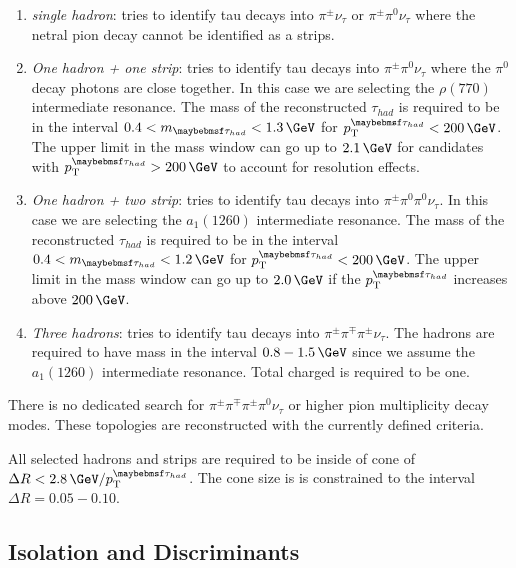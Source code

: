\begin{enumerate}
  \item \textit{single hadron}: tries to identify tau decays into $\pi^{\pm} \nu_\tau$ or $\pi^{\pm} \pi^{0} \nu_\tau$ where the netral pion decay cannot be identified as a strips.
  \item \textit{One hadron + one strip}: tries to identify tau decays into $\pi^{\pm} \pi^{0} \nu_\tau$ where the $\pi^{0}$ decay photons are close together. In this case we are selecting the $\rho(770)$ intermediate resonance. The mass of the reconstructed $\tau_{had}$ is required to be in the interval $0.4<m_{\tau_{had}}<1.3\,\GeV$ for $\pt^{\tau_{had}} < 200\,\GeV$. The upper limit in the mass window can go up to $2.1\,\GeV$ for candidates with $\pt^{\tau_{had}} > 200\,\GeV$ to account for resolution effects.
  \item \textit{One hadron + two strip}: tries to identify tau decays into $\pi^{\pm} \pi^{0} \pi^{0} \nu_\tau$. In this case we are selecting the $a_1(1260)$ intermediate resonance. The mass of the reconstructed $\tau_{had}$ is required to be in the interval $0.4<m_{\tau_{had}}<1.2\,\GeV$ for $\pt^{\tau_{had}} < 200\,\GeV$. The upper limit in the mass window can go up to $2.0\,\GeV$ if the $\pt^{\tau_{had}}$ increases above $200\,\GeV$.
  \item \textit{Three hadrons}: tries to identify tau decays into $\pi^{\pm} \pi^{\mp} \pi^{\pm} \nu_\tau$. The hadrons are required to have mass in the interval $0.8-1.5\,\GeV$ since we assume the $a_{1}(1260)$ intermediate resonance. Total charged is required to be one.
\end{enumerate}

There is no dedicated search for $\pi^{\pm} \pi^{\mp} \pi^{\pm} \pi^{0} \nu_\tau$ or higher pion multiplicity decay modes. These topologies are reconstructed with the currently defined criteria.

All selected hadrons and strips are required to be inside of cone of $\Delta R < 2.8\,\GeV/\pt^{\tau_{had}}$. The cone size is is constrained to the interval $\Delta R=0.05-0.10$. 

\subsection{Isolation and Discriminants}
\label{SECTION:EventReconstructionAndSimulation_Taus_IsolationAndDiscriminants}


